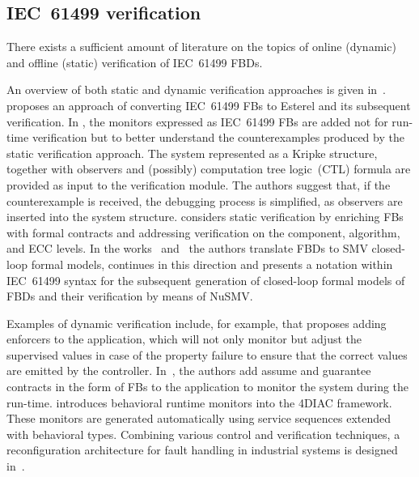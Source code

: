 \begin{bibunit}
\subsection{IEC~61499 verification}
There exists a sufficient amount of literature on the topics of online (dynamic) and offline (static) verification of IEC~61499 FBDs. 

An overview of both static and dynamic verification approaches is given in~\cite{15blech2016comparison}.
\cite{12yoong2010verifying} proposes an approach of converting IEC~61499 FBs to Esterel and its subsequent verification.
In \cite{13yoong2015verification,14bhatti2011observer}, the monitors expressed as IEC~61499 FBs are added not for run-time verification but to better understand the counterexamples produced by the static verification approach. The system represented as a Kripke structure, together with observers and (possibly) computation tree logic~(CTL) formula are provided as input to the verification module. The authors suggest that, if the counterexample is received, the debugging process is simplified, as observers are inserted into the system structure.
\cite{11lindgren2016contract} considers static verification by enriching FBs with formal contracts and addressing verification on the component, algorithm, and ECC levels. In the works~\cite{agn_case_study} and~\cite{agnostic} the authors translate FBDs to SMV closed-loop formal models, \cite{toolchain} continues in this direction and presents a notation within IEC~61499 syntax for the subsequent generation of closed-loop formal models of FBDs and their verification by means of NuSMV. 

Examples of dynamic verification include, for example, \cite{1falcone2022runtime} that proposes adding enforcers to the application, which will not only monitor but adjust the supervised values in case of the property failure to ensure that the correct values are emitted by the controller. In~\cite{3do2020towards, 8ng2019contract}, the authors add assume and guarantee contracts in the form of FBs to the application to monitor the system during the run-time. \cite{4wenger15behavior} introduces behavioral runtime monitors into the 4DIAC framework. These monitors are generated automatically using service sequences extended with behavioral types. Combining various control and verification techniques, a reconfiguration architecture for fault handling in industrial systems is designed in~\cite{10leitao2020fault}. 


\end{bibunit}
